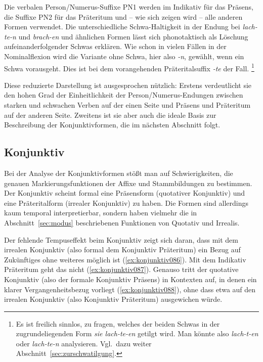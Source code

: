Die verbalen Person\slash Numerus-Suffixe PN1 werden im Indikativ für das Präsens, die Suffixe PN2 für das Präteritum und -- wie sich zeigen wird -- alle anderen Formen verwendet.
Die unterschiedliche Schwa-Hal\-tig\-keit in der Endung bei \textit{lach-te-n} und \textit{brach-en} und ähnlichen Formen lässt sich phonotaktisch als Löschung aufeinanderfolgender Schwas erklären.
Wie schon in vielen Fällen in der Nominalflexion wird die Variante ohne Schwa, hier also \textit{-n}, gewählt, wenn ein Schwa vorausgeht.
Dies ist bei dem vorangehenden Präteritalsuffix \textit{-te} der Fall.%
\footnote{Es ist freilich sinnlos, zu fragen, welches der beiden Schwas in der zugrundeliegenden Form \textit{sie lach-te-en} getilgt wird.
Man könnte also \textit{lach-t-en} oder \textit{lach-te-n} analysieren.
Vgl.\ dazu weiter Abschnitt~\ref{sec:zurschwatilgung}.}

Diese reduzierte Darstellung ist ausgesprochen nützlich:
Erstens verdeutlicht sie den hohen Grad der Einheitlichkeit der Person\slash Numerus-Endungen zwischen starken und schwachen Verben auf der einen Seite und Präsens und Präteritum auf der anderen Seite.
Zweitens ist sie aber auch die ideale Basis zur Beschreibung der Konjunktivformen, die im nächsten Abschnitt folgt.

\subsection{Konjunktiv}
\label{sec:konjunktiv}


Bei der Analyse der Konjunktivformen stößt man auf Schwierigkeiten, die genauen Markierungsfunktionen der Affixe und Stammbildungen zu bestimmen.
Der Konjunktiv scheint formal eine Präsensform (quotativer Konjunktiv) und eine Präteritalform (irrealer Konjunktiv) zu haben.
Die Formen sind allerdings kaum temporal interpretierbar, sondern haben vielmehr die in Abschnitt~\ref{sec:modus} beschriebenen Funktionen von Quotativ und Irrealis.

Der fehlende Tempuseffekt beim Konjunktiv zeigt sich \zB daran, dass mit dem irrealen Konjunktiv (also formal dem Konjunktiv Präteritum) ein Bezug auf Zukünftiges ohne weiteres möglich ist (\ref{ex:konjunktiv086}).
Mit dem Indikativ Präteritum geht das nicht (\ref{ex:konjunktiv087}).
Genauso tritt der quotative Konjunktiv (also der formale Konjunktiv Präsens) in Kontexten auf, in denen ein klarer Vergangenheitsbezug vorliegt (\ref{ex:konjunktiv088}), ohne dass etwa auf den irrealen Konjunktiv (also Konjunktiv Präteritum) ausgewichen würde.

